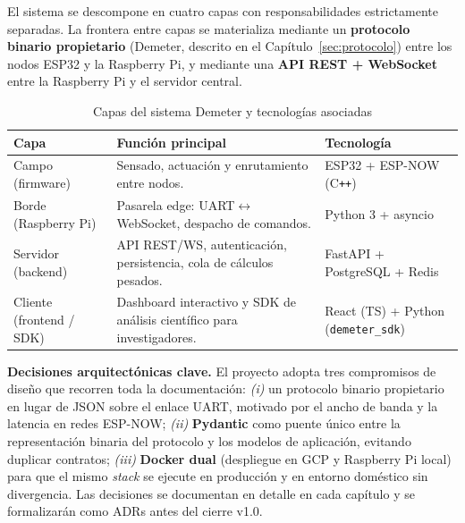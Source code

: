 El sistema se descompone en cuatro capas con responsabilidades estrictamente
separadas. La frontera entre capas se materializa mediante un \textbf{protocolo
binario propietario} (Demeter, descrito en el Capítulo~\ref{sec:protocolo}) entre
los nodos ESP32 y la Raspberry Pi, y mediante una \textbf{API REST + WebSocket}
entre la Raspberry Pi y el servidor central.

\begin{table}[H]
    \centering
    \caption{Capas del sistema Demeter y tecnologías asociadas}
    \begin{tabularx}{\textwidth}{lXl}
        \toprule
        \textbf{Capa}                       & \textbf{Función principal}                                                                       & \textbf{Tecnología} \\
        \midrule
        Campo (firmware)                    & Sensado, actuación y enrutamiento entre nodos.                                                     & ESP32 + ESP-NOW (C\texttt{++}) \\
        Borde (Raspberry Pi)                & Pasarela edge: UART$\leftrightarrow$WebSocket, despacho de comandos.                              & Python 3 + asyncio \\
        Servidor (backend)                  & API REST/WS, autenticación, persistencia, cola de cálculos pesados.                               & FastAPI + PostgreSQL + Redis \\
        Cliente (frontend / SDK)            & Dashboard interactivo y SDK de análisis científico para investigadores.                           & React (TS) + Python (\texttt{demeter\_sdk}) \\
        \bottomrule
    \end{tabularx}
    \label{tab:exec_arch}
\end{table}

\textbf{Decisiones arquitectónicas clave.} El proyecto adopta tres compromisos de
diseño que recorren toda la documentación: \textit{(i)} un protocolo binario
propietario en lugar de JSON sobre el enlace UART, motivado por el ancho de banda y la
latencia en redes ESP-NOW; \textit{(ii)} \textbf{Pydantic} como puente único entre la
representación binaria del protocolo y los modelos de aplicación, evitando duplicar
contratos; \textit{(iii)} \textbf{Docker dual} (despliegue en GCP y Raspberry Pi local)
para que el mismo \textit{stack} se ejecute en producción y en entorno doméstico sin
divergencia. Las decisiones se documentan en detalle en cada capítulo y se
formalizarán como ADRs antes del cierre v1.0.

